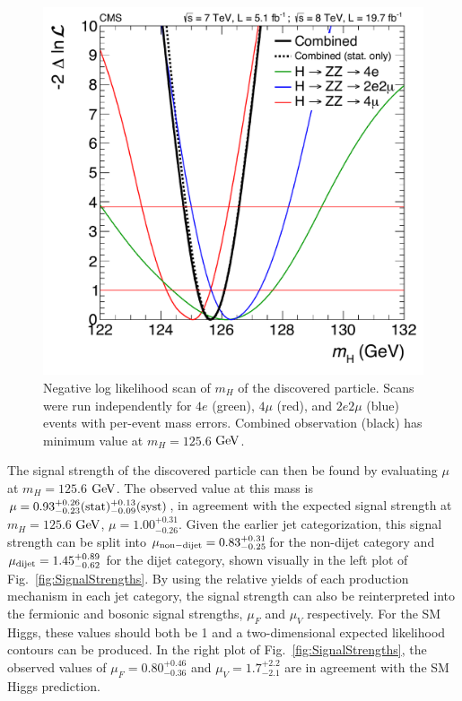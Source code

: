 \begin{figure}[htbp]
\begin{center}
\includegraphics[width=.45\linewidth]{HiggsDiscovery/figures/obs_1d_likelihood_mass_3Dbase_sys.pdf}
\caption[Mass Measurement of the Discovered Particle]{Negative log likelihood scan of $m_H$ of the discovered particle. Scans were run independently for $4e$ (green), $4\mu$ (red), and $2e2\mu$ (blue) events with per-event mass errors. Combined observation (black) has minimum value at $m_H=125.6$ $\rm{GeV}$.}
\label{fig:MassLikelihood}
\end{center}
\end{figure}

The signal strength of the discovered particle can then be found by evaluating $\mu$ at $m_H=125.6$ $\rm{GeV}$. The observed value at this mass is $\mu = 0.93^{+0.26}_{-0.23}(\rm{stat}) ^{+0.13}_{-0.09}(\rm{syst})$, in agreement with the expected signal strength at $m_H=125.6$ $\rm{GeV}$, $\mu = 1.00^{+0.31}_{-0.26}$. Given the earlier jet categorization, this signal strength can be split into $\mu_{\rm{non-dijet}}=0.83^{+0.31}_{-0.25}$for the non-dijet category and $\mu_{\rm{dijet}} = 1.45^{+0.89}_{-0.62}$ for the dijet category, shown visually in the left plot of Fig.~\ref{fig:SignalStrengths}. By using the relative yields of each production mechanism in each jet category, the signal strength can also be reinterpreted into the fermionic and bosonic signal strengths, $\mu_{F}$ and $\mu_{V}$ respectively. For the SM Higgs, these values should both be 1 and a two-dimensional expected likelihood contours can be produced. In the right plot of Fig.~\ref{fig:SignalStrengths}, the observed values of $\mu_F = 0.80^{+0.46}_{-0.36}$ and $\mu_V=1.7^{+2.2}_{-2.1}$ are in agreement with the SM Higgs prediction.

